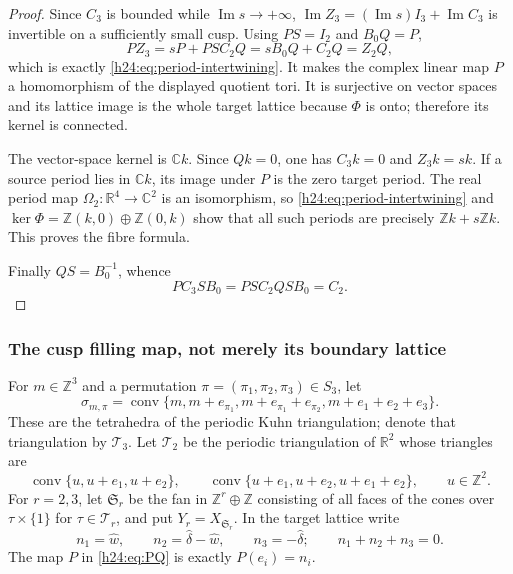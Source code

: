 \begin{proof}
Since $C_3$ is bounded while $\operatorname{Im}s\to+\infty$,
$\operatorname{Im}Z_3=(\operatorname{Im}s)I_3+\operatorname{Im}C_3$ is
invertible on a sufficiently small cusp.  Using $PS=I_2$ and $B_0Q=P$,
\[
 PZ_3=sP+PSC_2Q=sB_0Q+C_2Q=Z_2Q,
\]
which is exactly \eqref{h24:eq:period-intertwining}.  It makes the complex
linear map $P$ a homomorphism of the displayed quotient tori.  It is
surjective on vector spaces and its lattice image is the whole target
lattice because $\Phi$ is onto; therefore its kernel is connected.

The vector-space kernel is $\mathbb C k$.  Since $Qk=0$, one has $C_3k=0$ and
$Z_3k=sk$.  If a source period lies in $\mathbb C k$, its image under $P$ is the
zero target period.  The real period map $\Omega_2:\mathbb R^4\to\mathbb C^2$ is an
isomorphism, so \eqref{h24:eq:period-intertwining} and
$\ker\Phi=\mathbb Z(k,0)\oplus\mathbb Z(0,k)$ show that all such periods are precisely
$\mathbb Z k+s\mathbb Z k$.  This proves the fibre formula.

Finally $QS=B_0^{-1}$, whence
\[
 PC_3SB_0=PSC_2QSB_0=C_2.
\]
\end{proof}

\subsubsection{The cusp filling map, not merely its boundary lattice}

For $m\in\mathbb Z^3$ and a permutation
$\pi=(\pi_1,\pi_2,\pi_3)\in S_3$, let
\begin{equation}
 \sigma_{m,\pi}=\operatorname{conv}
 \{m,m+e_{\pi_1},m+e_{\pi_1}+e_{\pi_2},m+e_1+e_2+e_3\}.
 \label{h24:eq:kuhn-tetrahedron}
\end{equation}
These are the tetrahedra of the periodic Kuhn triangulation; denote that
triangulation by $\mathcal T_3$.  Let $\mathcal T_2$ be the periodic
triangulation of $\mathbb R^2$ whose triangles are
\[
 \operatorname{conv}\{u,u+e_1,u+e_2\},\qquad
 \operatorname{conv}\{u+e_1,u+e_2,u+e_1+e_2\},
 \qquad u\in\mathbb Z^2.
\]
For $r=2,3$, let $\mathfrak S_r$ be the fan in $\mathbb Z^r\oplus\mathbb Z$ consisting
of all faces of the cones over $\tau\times\{1\}$ for
$\tau\in\mathcal T_r$, and put $Y_r=X_{\mathfrak S_r}$.  In the target
lattice write
\[
 n_1=\widehat w,\qquad n_2=\widehat\delta-\widehat w,\qquad
 n_3=-\widehat\delta;\qquad n_1+n_2+n_3=0.
\]
The map $P$ in \eqref{h24:eq:PQ} is exactly $P(e_i)=n_i$.

